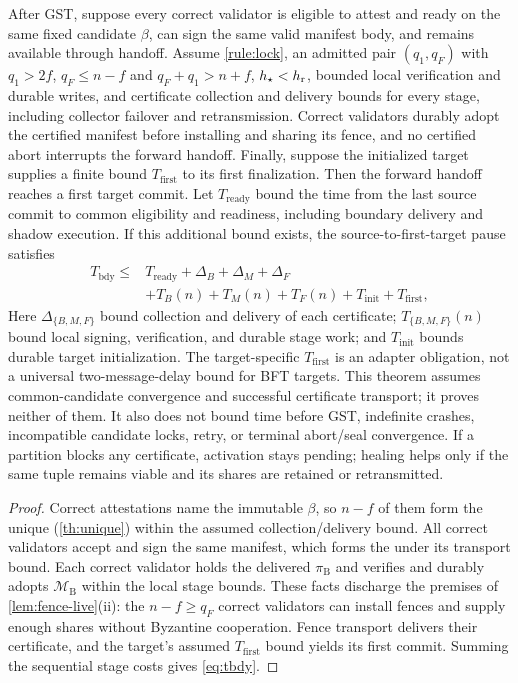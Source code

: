 \begin{theorem}
\label{th:liveness}
After GST, suppose every correct validator is eligible to attest and ready on the same fixed
candidate $\beta$, can sign the same valid manifest body, and remains available through handoff.
Assume \cref{rule:lock}, an admitted pair $(q_1,q_F)$ with $q_1>2f$, $q_F\le n-f$ and
$q_F+q_1>n+f$, $h_{\star}<h_{\mathrm r}$, bounded local verification and durable writes, and certificate collection
and delivery bounds for every stage, including collector failover and retransmission. Correct
validators durably adopt the certified manifest before installing and sharing its fence, and no
certified abort interrupts the forward handoff. Finally,
suppose the initialized target supplies a finite bound $T_{\mathrm{first}}$ to its first finalization.
Then the forward handoff reaches a first target commit. Let $T_{\mathrm{ready}}$ bound the time from
the last source commit to common eligibility and readiness, including boundary delivery and shadow
execution. If this additional bound exists, the source-to-first-target pause satisfies
\begin{equation}
  \begin{aligned}
  T_{\mathrm{bdy}}\le{}& T_{\mathrm{ready}}+\Delta_B+\Delta_M+\Delta_F\\
  &+T_B(n)+T_M(n)+T_F(n)+T_{\mathrm{init}}+T_{\mathrm{first}},
  \end{aligned}
  \label{eq:tbdy}
\end{equation}
Here $\Delta_{\{B,M,F\}}$ bound collection and delivery of each certificate;
$T_{\{B,M,F\}}(n)$ bound local signing, verification, and durable stage work; and
$T_{\mathrm{init}}$ bounds durable target initialization. The target-specific
$T_{\mathrm{first}}$ is an adapter obligation, not a universal two-message-delay bound for BFT
targets. This theorem assumes common-candidate convergence and successful certificate transport;
it proves neither of them. It also does not bound time before GST, indefinite crashes, incompatible
candidate locks, retry, or terminal abort/seal convergence. If a partition blocks any certificate,
activation stays pending; healing helps only if the same tuple remains viable and its shares are
retained or retransmitted.
\end{theorem}
\begin{proof}
Correct attestations name the immutable $\beta$, so $n-f$ of them form the unique \CutCert{}
(\cref{th:unique}) within the assumed collection/delivery bound. All correct validators accept and
sign the same manifest, which forms the \ManCert{} under its transport bound.
Each correct validator holds the delivered $\pi_{\mathrm B}$ and verifies and durably adopts
$\mathcal M_{\mathrm B}$ within the local stage bounds. These facts discharge the premises of
\cref{lem:fence-live}(ii): the $n-f\ge q_F$ correct validators can install fences and supply enough
shares without Byzantine cooperation. Fence transport delivers their certificate, and the target's
assumed $T_{\mathrm{first}}$ bound yields its first commit. Summing the sequential stage costs
gives \eqref{eq:tbdy}.
\end{proof}

